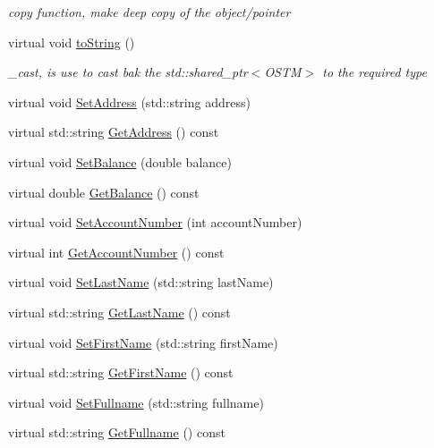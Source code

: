\begin{DoxyCompactItemize}
\begin{DoxyCompactList}\small\item\em copy function, make deep copy of the object/pointer \end{DoxyCompactList}\item 
virtual void \hyperlink{class_b_o_i_ab02a4dd4ebcc5b2abfaca19f2dff2006}{to\+String} ()
\begin{DoxyCompactList}\small\item\em \+\_\+cast, is use to cast bak the std\+::shared\+\_\+ptr$<$\+O\+S\+T\+M$>$ to the required type \end{DoxyCompactList}\item 
virtual void \hyperlink{class_b_o_i_a00c9386c862cf2442968bf7fc30102b3}{Set\+Address} (std\+::string address)
\item 
virtual std\+::string \hyperlink{class_b_o_i_a8920e1f47b22445ba954e86012207462}{Get\+Address} () const 
\item 
virtual void \hyperlink{class_b_o_i_a416667693c10f5e4120eec97a9269348}{Set\+Balance} (double balance)
\item 
virtual double \hyperlink{class_b_o_i_a25b289dece2a1685bb9d1a9332c9be0b}{Get\+Balance} () const 
\item 
virtual void \hyperlink{class_b_o_i_affc9e7e2a36214b3790f250b7108bb65}{Set\+Account\+Number} (int account\+Number)
\item 
virtual int \hyperlink{class_b_o_i_a5b18e1538f3d37835234946cdf9f240f}{Get\+Account\+Number} () const 
\item 
virtual void \hyperlink{class_b_o_i_a663906e9a59ffa970fb928746c01e8af}{Set\+Last\+Name} (std\+::string last\+Name)
\item 
virtual std\+::string \hyperlink{class_b_o_i_a37828f3fa4a32f522966e2cad90eaab2}{Get\+Last\+Name} () const 
\item 
virtual void \hyperlink{class_b_o_i_ae9042f87be085c2cec799981c30d7d19}{Set\+First\+Name} (std\+::string first\+Name)
\item 
virtual std\+::string \hyperlink{class_b_o_i_ab4b9d50c6008a666aa4382def580e7d1}{Get\+First\+Name} () const 
\item 
virtual void \hyperlink{class_b_o_i_a93091f16610f1a1474aea31fd5f81ffd}{Set\+Fullname} (std\+::string fullname)
\item 
virtual std\+::string \hyperlink{class_b_o_i_af56446a377068cd65526e40e8b31b878}{Get\+Fullname} () const 
\end{DoxyCompactItemize}


